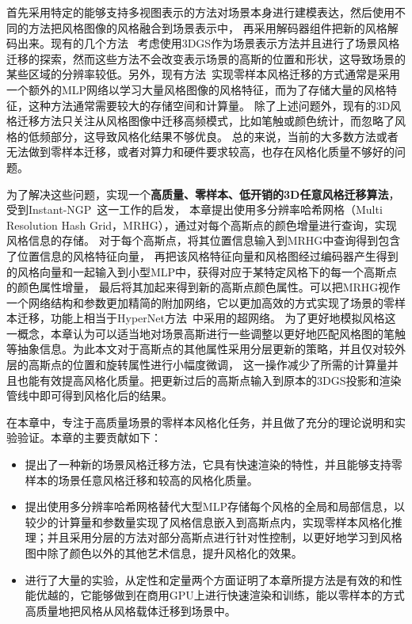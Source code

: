 首先采用特定的能够支持多视图表示的方法对场景本身进行建模表达，然后使用不同的方法把风格图像的风格融合到场景表示中，
再采用解码器组件把新的风格解码出来。现有的几个方法~\cite{saroha2024gaussian,jain2024stylesplat,zhang2024stylizedgs,chen2024gaussianeditor,liu2024stylegaussian}
考虑使用3DGS作为场景表示方法并且进行了场景风格迁移的探索，然而这些方法不会改变表示场景的高斯的位置和形状，这导致场景的某些区域的分辨率较低。另外，现有方法~\cite{chiang2022stylizing}实现零样本风格迁移的方式通常是采用一个额外的MLP网络以学习大量风格图像的风格特征，而为了存储大量的风格特征，这种方法通常需要较大的存储空间和计算量。
除了上述问题外，现有的3D风格迁移方法只关注从风格图像中迁移高频模式，比如笔触或颜色统计，而忽略了风格的低频部分，这导致风格化结果不够优良。
总的来说，当前的大多数方法或者无法做到零样本迁移，或者对算力和硬件要求较高，也存在风格化质量不够好的问题。
\par 为了解决这些问题，实现一个\textbf{高质量、零样本、低开销的3D任意风格迁移算法}，受到Instant-NGP~\cite{muller2022instant}这一工作的启发，
本章提出使用多分辨率哈希网格（Multi Resolution Hash Grid，MRHG），通过对每个高斯点的颜色增量进行查询，实现风格信息的存储。
对于每个高斯点，将其位置信息输入到MRHG中查询得到包含了位置信息的风格特征向量，
再把该风格特征向量和风格图经过编码器产生得到的风格向量和一起输入到小型MLP中，获得对应于某特定风格下的每一个高斯点的颜色属性增量，
最后将其加起来得到新的高斯点颜色属性。可以把MRHG视作一个网络结构和参数更加精简的附加网络，它以更加高效的方式实现了场景的零样本迁移，功能上相当于HyperNet方法~\cite{chiang2022stylizing}中采用的超网络。
为了更好地模拟风格这一概念，本章认为可以适当地对场景高斯进行一些调整以更好地匹配风格图的笔触等抽象信息。为此本文对于高斯点的其他属性采用分层更新的策略，并且仅对较外层的高斯点的位置和旋转属性进行小幅度微调，
这一操作减少了所需的计算量并且也能有效提高风格化质量。把更新过后的高斯点输入到原本的3DGS投影和渲染管线中即可得到风格化后的结果。
\par 在本章中，专注于高质量场景的零样本风格化任务，并且做了充分的理论说明和实验验证。本章的主要贡献如下：
\begin{itemize}
    \item 提出了一种新的场景风格迁移方法，它具有快速渲染的特性，并且能够支持零样本的场景任意风格迁移和较高的风格化质量。
    \item 提出使用多分辨率哈希网格替代大型MLP存储每个风格的全局和局部信息，以较少的计算量和参数量实现了风格信息嵌入到高斯点内，实现零样本风格化推理；并且采用分层的方法对部分高斯点进行针对性控制，以更好地学习到风格图中除了颜色以外的其他艺术信息，提升风格化的效果。
    \item 进行了大量的实验，从定性和定量两个方面证明了本章所提方法是有效的和性能优越的，它能够做到在商用GPU上进行快速渲染和训练，能以零样本的方式高质量地把风格从风格载体迁移到场景中。
\end{itemize}

